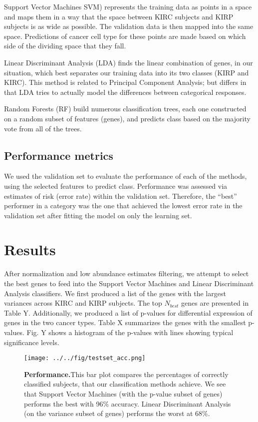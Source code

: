 Support Vector Machines SVM) represents the training data as points in a space
and maps them in a way that the space between KIRC subjects and KIRP subjects
is as wide as possible. The validation data is then mapped into the same space.
Predictions of cancer cell type for these points are made based on which side
of the dividing space that they fall. 

Linear Discriminant Analysis (LDA) finds the linear combination of genes, in
our situation, which best separates our training data into its two classes
(KIRP and KIRC). This method is related to Principal Component Analysis; but
differs in that LDA tries to actually model the differences between categorical
responses.

Random Forests (RF) build numerous classification trees, each one constructed
on a random subset of features (genes), and predicts class based on the
majority vote from all of the trees.

\subsection*{Performance metrics}

We used the validation set to evaluate the performance of each of the methods,
using the selected features to predict class. Performance was assessed via
estimates of risk (error rate) within the validation set. Therefore, the
``best'' performer in a category was the one that achieved the lowest error
rate in the validation set after fitting the model on only the learning set.

\section{Results}

After normalization and low abundance estimates filtering, we attempt to select the
best genes to feed into the Support Vector Machines and Linear Discriminant
Analysis classifiers.  We first produced a list of the genes with the largest
variances across KIRC and KIRP subjects.  The top $N_{best}$ genes are
presented in Table Y. Additionally, we produced a list of p-values for
differential expression of genes in the two cancer types. Table X summarizes
the genes with the smallest p-values. Fig. Y shows a histogram of the p-values
with lines showing typical significance levels. 

\begin{figure}[H]
  \centering
    \texttt{[image: ../../fig/testset\_acc.png]}
\caption{\textbf{Performance.}This bar plot compares the percentages of correctly
  classified subjects, that our classification methods achieve. We see that
  Support Vector Machines (with the p-value subset of genes) performs the best
  with 96\% accuracy. Linear Discriminant Analysis (on the variance subset of
  genes) performs the worst at 68\%.}
   \label{fig:performance}
\end{figure}


